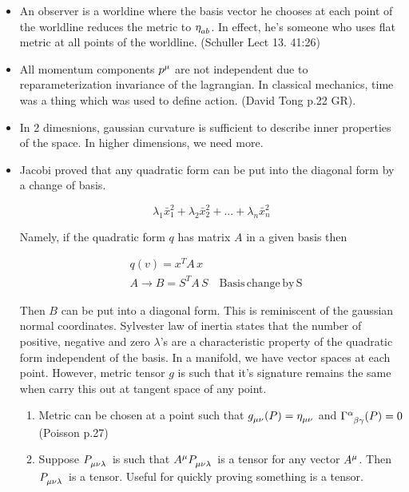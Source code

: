 \documentclass{report}
\begin{document}
\begin{itemize}
  \item An observer is a worldine where the basis vector he chooses at each point of the worldline reduces the metric to $\eta\indices{_a_b}$. In effect, he's someone who uses flat metric at all points of the worldline. (Schuller Lect 13. 41:26)

  \item All momentum components $p\indices{^\mu}$ are not independent due to reparameterization invariance of the lagrangian. In classical mechanics, time was a thing which was used to define action. (David Tong p.22 GR).


  \item In 2 dimesnions, gaussian curvature is sufficient to describe inner properties of the space. In higher dimensions, we need more.

  \item Jacobi proved that any quadratic form can be put into the diagonal form by a change of basis.

    $$\lambda_1\bar{x}_1^2 + \lambda_2\bar{x}_2^2+...+\lambda_n\bar{x}_n^2$$

    Namely, if the quadratic form $q$ has matrix $A$ in a given basis then

    \begin{align}
      &q(v) = x^T A \,x\\
      &A\rightarrow B = S^T A \,S \quad \mathrm{Basis\, change\, by\, S}
    \end{align}

    Then $B$ can be put into a diagonal form. This is reminiscent of the gaussian normal coordinates. Sylvester law of inertia states that the number of positive, negative and zero $\lambda$'s are a characteristic property of the quadratic form independent of the basis. In a manifold, we have vector spaces at each point. However, metric tensor $g$ is such that it's signature remains the same when carry this out at tangent space of any point.

    \begin{enumerate}
      \item Metric can be chosen at a point such that $g\indices{_\mu_\nu}(P) = \eta\indices{_\mu_\nu}$ and $\Gamma\indices{^\alpha_\beta_\gamma}(P) = 0$ (Poisson p.27)

      \item Suppose $P\indices{_\mu_\nu_\lambda}$ is such that $A\indices{^\mu}P\indices{_\mu_\nu_\lambda}$ is a tensor for any vector $A\indices{^\mu}$. Then $P\indices{_\mu_\nu_\lambda}$ is a tensor. Useful for quickly proving something is a tensor.
      

\end{enumerate}
\end{itemize}
\end{document}

